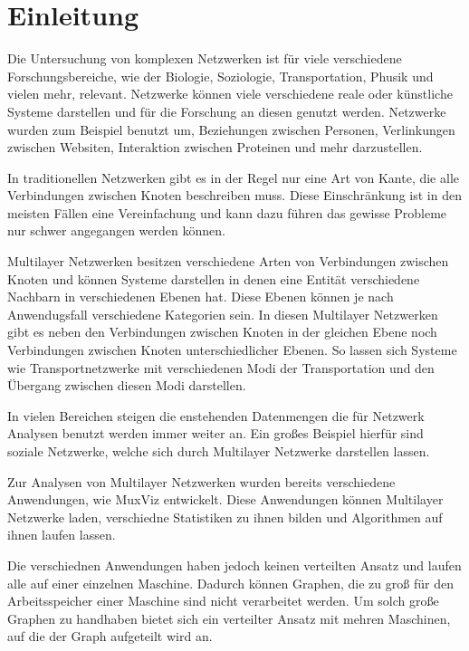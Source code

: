 \chapter{Einleitung}



Die Untersuchung von komplexen Netzwerken ist für viele verschiedene Forschungsbereiche, wie der Biologie, Soziologie, Transportation, Phusik und vielen mehr, relevant. 
Netzwerke können viele verschiedene reale oder künstliche Systeme darstellen und für die Forschung an diesen genutzt werden. Netzwerke wurden zum Beispiel benutzt um, Beziehungen zwischen Personen, Verlinkungen zwischen Websiten, Interaktion zwischen Proteinen und mehr darzustellen.

In traditionellen Netzwerken gibt es in der Regel nur eine Art von Kante, die alle Verbindungen zwischen Knoten beschreiben muss.
Diese Einschränkung ist in den meisten Fällen eine Vereinfachung und kann dazu führen das gewisse Probleme nur schwer angegangen werden können. 

Multilayer Netzwerken besitzen verschiedene Arten von Verbindungen zwischen Knoten und können Systeme darstellen in denen eine Entität verschiedene Nachbarn in verschiedenen Ebenen hat.
Diese Ebenen können je nach Anwendugsfall verschiedene Kategorien sein. In diesen Multilayer Netzwerken gibt es neben den Verbindungen zwischen Knoten in der gleichen Ebene noch Verbindungen zwischen Knoten unterschiedlicher Ebenen.
So lassen sich Systeme wie Transportnetzwerke mit verschiedenen Modi der Transportation und den Übergang zwischen diesen Modi darstellen.

In vielen Bereichen steigen die enstehenden Datenmengen die für Netzwerk Analysen benutzt werden immer weiter an. Ein großes Beispiel hierfür sind soziale Netzwerke, welche sich durch Multilayer Netzwerke darstellen lassen.


Zur Analysen von Multilayer Netzwerken wurden bereits verschiedene Anwendungen, wie MuxViz entwickelt. Diese Anwendungen können Multilayer Netzwerke laden, verschiedne Statistiken zu ihnen bilden und Algorithmen auf ihnen laufen lassen.

Die verschiednen Anwendungen haben jedoch keinen verteilten Ansatz und laufen alle auf einer einzelnen Maschine. Dadurch können Graphen, die zu groß für den Arbeitsspeicher einer Maschine sind nicht verarbeitet werden. 
Um solch große Graphen zu handhaben bietet sich ein verteilter Ansatz mit mehren Maschinen, auf die der Graph aufgeteilt wird an.


